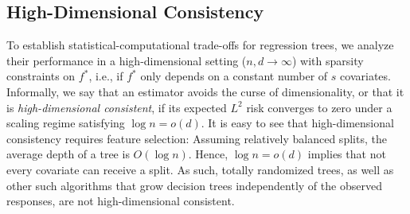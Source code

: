 \documentclass[11pt]{article}
\newcommand{\sparsity}{s}
\newcommand{\nfeats}{d}
\newcommand{\nsamples}{n}
\begin{document}
\subsection{High-Dimensional Consistency}



To establish statistical-computational trade-offs for regression trees, we analyze their performance in a high-dimensional setting ($n, d \to \infty$) with sparsity constraints on $f^*$, i.e., if $f^*$ only depends on a constant number of $\sparsity$ covariates. Informally, we say that an estimator avoids the curse of dimensionality, or that it is \emph{high-dimensional consistent}, if its expected $L^2$ risk converges to zero under a scaling regime satisfying $\log \nsamples = o(\nfeats)$.
It is easy to see that high-dimensional consistency requires feature selection:
Assuming relatively balanced splits, the average depth of a tree is $O(\log \nsamples)$.
Hence, $\log n = o(d)$ implies that not every covariate can receive a split.
As such, totally randomized trees, as well as other such algorithms that grow decision trees independently of the observed responses, are not high-dimensional consistent.
\end{document}
